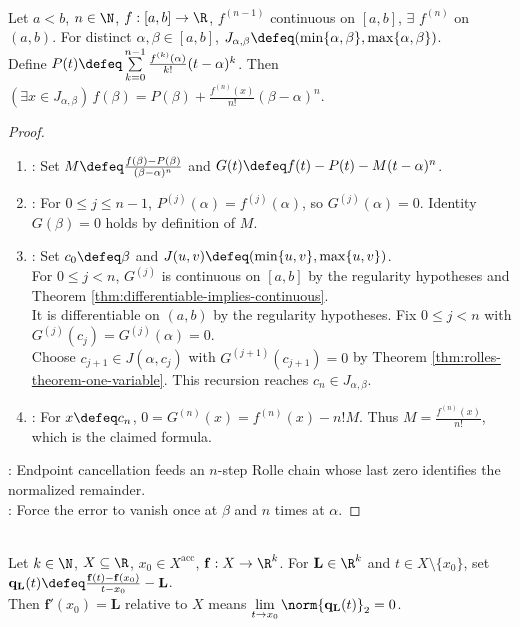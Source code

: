 \begin{theorem} \label{thm:taylor-theorem-lagrange-remainder} \\
Let $a<b$, $n\in\N$, $f:[a,b]\to\R$, $f^{(n-1)}$ continuous on $[a,b]$, $\exists$ $f^{(n)}$ on $(a,b)$. For distinct $\alpha,\beta\in[a,b]$, $J_{\alpha,\beta}\defeq(\min\{\alpha,\beta\},\max\{\alpha,\beta\})$.\\
Define $P(t)\defeq\sum\limits_{k=0}^{n-1}\frac{f^{(k)}(\alpha)}{k!}(t-\alpha)^k$. Then $(\exists x\in J_{\alpha,\beta})\,f(\beta)=P(\beta)+\frac{f^{(n)}(x)}{n!}(\beta-\alpha)^n$.
\begin{proof}
\begin{enumerate}[label=(\roman*)]
\setlength{\itemsep}{0pt}
\item {}: Set $M\defeq\frac{f(\beta)-P(\beta)}{(\beta-\alpha)^n}$ and $G(t)\defeq f(t)-P(t)-M(t-\alpha)^n$.
\item {}: For $0\leq j\leq n-1$, $P^{(j)}(\alpha)=f^{(j)}(\alpha)$, so $G^{(j)}(\alpha)=0$. Identity $G(\beta)=0$ holds by definition of $M$.
\item {}: Set $c_0\defeq\beta$ and $J(u,v)\defeq(\min\{u,v\},\max\{u,v\})$.\\
For $0\leq j<n$, $G^{(j)}$ is continuous on $[a,b]$ by the regularity hypotheses and Theorem \ref{thm:differentiable-implies-continuous}.\\
It is differentiable on $(a,b)$ by the regularity hypotheses. Fix $0\leq j<n$ with $G^{(j)}(c_j)=G^{(j)}(\alpha)=0$.\\
Choose $c_{j+1}\in J(\alpha,c_j)$ with $G^{(j+1)}(c_{j+1})=0$ by Theorem \ref{thm:rolles-theorem-one-variable}. This recursion reaches $c_n\in J_{\alpha,\beta}$.
\item {}: For $x\defeq c_n$, $0=G^{(n)}(x)=f^{(n)}(x)-n!M$. Thus $M=\frac{f^{(n)}(x)}{n!}$, which is the claimed formula.
\end{enumerate}
: Endpoint cancellation feeds an $n$-step Rolle chain whose last zero identifies the normalized remainder.\\
: Force the error to vanish once at $\beta$ and $n$ times at $\alpha$.
\end{proof}
\end{theorem}

\begin{definition} \label{def:vector-valued-derivative-one-variable} \\
Let $k\in\N$, $X\subseteq\R$, $x_0\in X^{\operatorname{acc}}$, $\mathbf{f}:X\to\R^k$. For $\mathbf{L}\in\R^k$ and $t\in X\setminus\{x_0\}$, set $\mathbf{q}_{\mathbf{L}}(t)\defeq\frac{\mathbf{f}(t)-\mathbf{f}(x_0)}{t-x_0}-\mathbf{L}$.\\
Then $\mathbf{f}'(x_0)=\mathbf{L}$ relative to $X$ means $\lim\limits_{t\to x_0}\norm{\mathbf{q}_{\mathbf{L}}(t)}_2=0$.
\end{definition}

